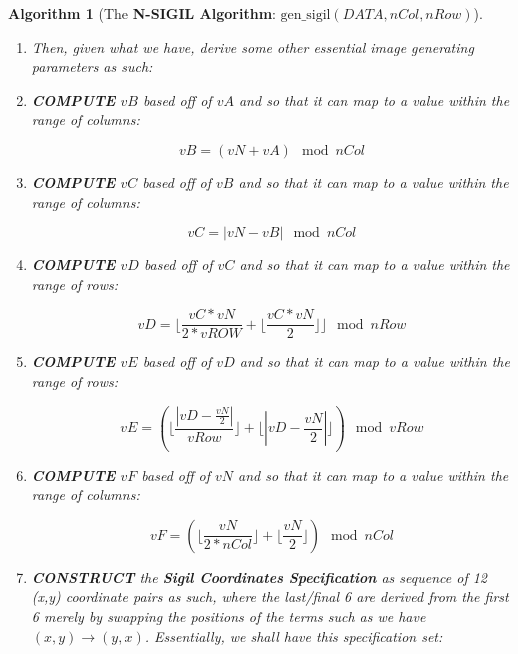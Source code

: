 \documentclass[a4paper, 18pt]{book} %
\newtheorem{alg}{Algorithm}
\begin{document}
\begin{alg}[The \textbf{N-SIGIL Algorithm}: $\text{gen\_sigil}(DATA, nCol, nRow)$]
\begin{enumerate}
{}

\item Then, given what we have, derive some other essential image generating parameters as such:

\item{\textbf{COMPUTE} $vB$ based off of $vA$ and  so that it can map to a value within the range of columns:

\begin{equation}
vB =  (vN + vA) \mod nCol
\end{equation}

}

\item{\textbf{COMPUTE} $vC$ based off of $vB$ and  so that it can map to a value within the range of columns:

\begin{equation}
vC =  |vN - vB| \mod nCol
\end{equation}

}

\item{\textbf{COMPUTE} $vD$ based off of $vC$ and  so that it can map to a value within the range of rows:

\begin{equation}
vD =  \lfloor \frac{vC*vN}{2*vROW} + \lfloor \frac{vC*vN}{2} \rfloor \rfloor \mod nRow
\end{equation}

}

\item{\textbf{COMPUTE} $vE$ based off of $vD$ and  so that it can map to a value within the range of rows:

\begin{equation}
vE =  (\lfloor \frac{|vD - \frac{vN}{2}|}{vRow} \rfloor + \lfloor |vD - \frac{vN}{2}| \rfloor) \mod vRow
\end{equation}

}


\item{\textbf{COMPUTE} $vF$ based off of $vN$ and  so that it can map to a value within the range of columns:

\begin{equation}
vF =  (\lfloor \frac{vN}{2*nCol} \rfloor + \lfloor \frac{vN}{2} \rfloor) \mod nCol
\end{equation}

}

\item { \textbf{CONSTRUCT} the \textbf{Sigil Coordinates Specification} as sequence of 12 (x,y) coordinate pairs as such, where the last/final 6 are derived from the first 6 merely by swapping the positions of the terms such as we have $(x,y) \rightarrow (y,x)$. Essentially, we shall have this specification set:

}
\end{enumerate}
\end{alg}
\end{document}

